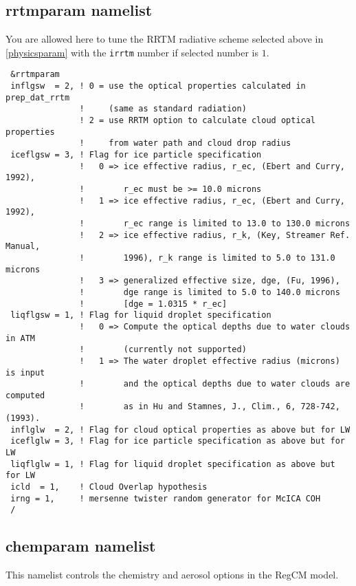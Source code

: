 \subsection{rrtmparam namelist}

You are allowed here to tune the RRTM radiative scheme selected above in
\ref{physicsparam} with the \verb=irrtm= number if selected number is $1$. 

{\footnotesize
\begin{Verbatim}
 &rrtmparam
 inflgsw  = 2, ! 0 = use the optical properties calculated in prep_dat_rrtm
               !     (same as standard radiation)
               ! 2 = use RRTM option to calculate cloud optical properties
               !     from water path and cloud drop radius
 iceflgsw = 3, ! Flag for ice particle specification
               !   0 => ice effective radius, r_ec, (Ebert and Curry, 1992),
               !        r_ec must be >= 10.0 microns
               !   1 => ice effective radius, r_ec, (Ebert and Curry, 1992),
               !        r_ec range is limited to 13.0 to 130.0 microns
               !   2 => ice effective radius, r_k, (Key, Streamer Ref. Manual,
               !        1996), r_k range is limited to 5.0 to 131.0 microns
               !   3 => generalized effective size, dge, (Fu, 1996),
               !        dge range is limited to 5.0 to 140.0 microns
               !        [dge = 1.0315 * r_ec]
 liqflgsw = 1, ! Flag for liquid droplet specification
               !   0 => Compute the optical depths due to water clouds in ATM
               !        (currently not supported)
               !   1 => The water droplet effective radius (microns) is input
               !        and the optical depths due to water clouds are computed
               !        as in Hu and Stamnes, J., Clim., 6, 728-742, (1993).
 inflglw  = 2, ! Flag for cloud optical properties as above but for LW
 iceflglw = 3, ! Flag for ice particle specification as above but for LW
 liqflglw = 1, ! Flag for liquid droplet specification as above but for LW
 icld  = 1,    ! Cloud Overlap hypothesis
 irng = 1,     ! mersenne twister random generator for McICA COH
 /
\end{Verbatim}
}

\subsection{chemparam namelist}
\label{chemparam}

This namelist controls the chemistry and aerosol options in the RegCM model.

